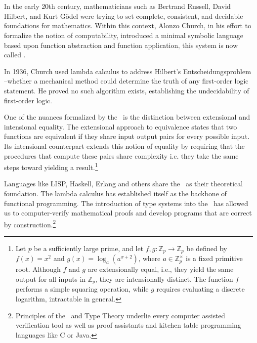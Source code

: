 \documentclass[12pt]{book}
\begin{document}
\chapter{\lCalc}

In the early 20th century, mathematicians such as Bertrand Russell, David Hilbert, and Kurt Gödel were trying to set complete, consistent, and decidable foundations for mathematics. Within this context, Alonzo Church, in his effort to formalize the notion of  computability, introduced a minimal symbolic language based upon function abstraction and function application, this system is now called \lcalc.

In 1936, Church used lambda calculus to address Hilbert’s Entscheidungsproblem --whether a mechanical method could determine the truth of any first-order logic statement. He proved no such algorithm exists, establishing the undecidability of first-order logic.

One of the nuances formalized by the \lcalc \ is the distinction between extensional and intensional equality. The extensional approach to equivalence states that two functions are equivalent if they share input output pairs for every possible input. Its intensional counterpart extends this notion of equality by requiring that the procedures that compute these pairs share complexity i.e. they take the same steps toward yielding a result.\footnote{
  Let \( p \) be a sufficiently large prime, and let \( f, g : \mathbb{Z}_p \to \mathbb{Z}_p \) be defined by \( f(x) = x^2 \) and \( g(x) = \log_a(a^{x+2}) \), where \( a \in \mathbb{Z}_p^\times \) is a fixed primitive root. Although \( f \) and \( g \) are extensionally equal, i.e., they yield the same output for all inputs in \( \mathbb{Z}_p \), they are intensionally distinct. The function \( f \) performs a simple squaring operation, while \( g \) requires evaluating a discrete logarithm, intractable in general. 
}

Languages like LISP, Haskell, Erlang and others share the \lcalc \ as their theoretical foundation. The lambda calculus has established itself as the backbone of functional programming. The introduction of type systems into the \lcalc \ has allowed us to computer-verify mathematical proofs and develop programs that are correct by construction.\footnote{Principles of the \lcalc \ and Type Theory underlie every computer assisted verification tool as well as proof assistants and kitchen table programming languages like C or Java.}


\newpage

\newpage

\newpage

\newpage

\end{document}
